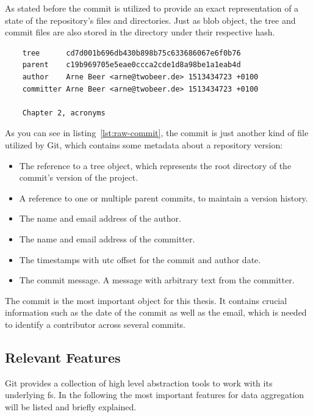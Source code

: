 As stated before the commit is utilized to provide an exact representation of a state of the repository's files and directories.
Just as blob object, the tree and commit files are also stored in the  directory under their respective hash.

\begin{verbatim}
    tree      cd7d001b696db430b898b75c633686067e6f0b76
    parent    c19b969705e5eae0ccca2cde1d8a98be1a1eab4d
    author    Arne Beer <arne@twobeer.de> 1513434723 +0100
    committer Arne Beer <arne@twobeer.de> 1513434723 +0100

    Chapter 2, acronyms
\end{verbatim}
\begingroup
{}
\endgroup

As you can see in listing~\ref{lst:raw-commit}, the commit is just another kind of file utilized by Git, which contains some metadata about a repository version:

\begin{itemize}
    \item The reference to a tree object, which represents the root directory of the commit's version of the project.
    \item A reference to one or multiple parent commits, to maintain a version history.
    \item The name and email address of the author.
    \item The name and email address of the committer.
    \item The timestamps with \ac{utc} offset for the commit and author date.
    \item The commit message. A message with arbitrary text from the committer.
\end{itemize}

The commit is the most important object for this thesis.
It contains crucial information such as the date of the commit as well as the email, which is needed to identify a contributor across several commits.

\subsection{Relevant Features}
Git provides a collection of high level abstraction tools to work with its underlying \ac{fs}.
In the following the most important features for data aggregation will be listed and briefly explained.

